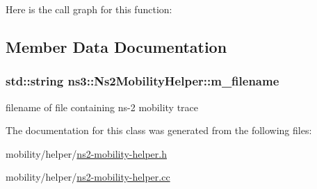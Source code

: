 Here is the call graph for this function\+:




\subsection{Member Data Documentation}
\subsubsection[{\texorpdfstring{m\+\_\+filename}{m_filename}}]{\setlength{\rightskip}{0pt plus 5cm}std\+::string ns3\+::\+Ns2\+Mobility\+Helper\+::m\+\_\+filename\hspace{0.3cm}{\ttfamily [private]}}\hypertarget{classns3_1_1Ns2MobilityHelper_a788b7d060c9c7c853f227e9315378316}{}\label{classns3_1_1Ns2MobilityHelper_a788b7d060c9c7c853f227e9315378316}


filename of file containing ns-\/2 mobility trace 



The documentation for this class was generated from the following files\+:\begin{DoxyCompactItemize}
\item 
mobility/helper/\hyperlink{ns2-mobility-helper_8h}{ns2-\/mobility-\/helper.\+h}\item 
mobility/helper/\hyperlink{ns2-mobility-helper_8cc}{ns2-\/mobility-\/helper.\+cc}\end{DoxyCompactItemize}
